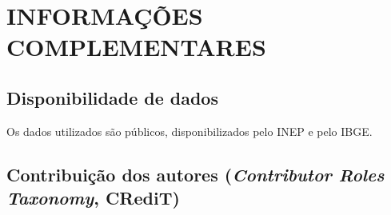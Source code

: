 \section{INFORMAÇÕES COMPLEMENTARES}
\label{sec:complementares}

\subsection{Disponibilidade de dados}

Os dados utilizados são públicos, disponibilizados pelo INEP e pelo IBGE.

\ifidentificado

\subsection{Contribuição dos autores (\textit{Contributor Roles Taxonomy}, CRediT)}

\imprimecontribuicoes

\fi

